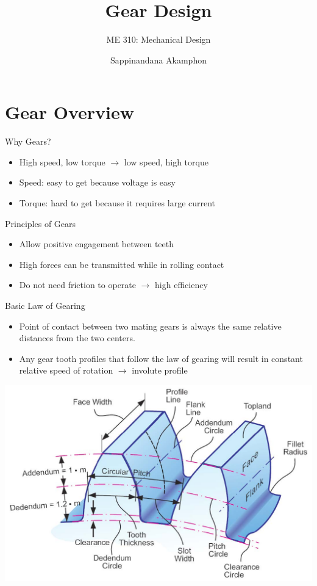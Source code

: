 \documentclass[10pt, svgnames]{beamer}
\author{Sappinandana Akamphon}
\date{}
\title{Gear Design}
\subtitle{ME 310: Mechanical Design}
\institute{Department of Mechanical Engineering, TSE}
\begin{document}
\maketitle

\section{Gear Overview}
\label{gear-overview}
\begin{frame}[label={sec:orgb5e6910}]{Why Gears?}
\begin{itemize}
\item High speed, low torque \(\rightarrow\) low speed, high torque

\item Speed: easy to get because voltage is easy

\item Torque: hard to get because it requires large current
\end{itemize}
\end{frame}

\begin{frame}[label={sec:org250578e}]{Principles of Gears}
\begin{itemize}
\item Allow positive engagement between teeth

\item High forces can be transmitted while in rolling contact

\item Do not need friction to operate \(\rightarrow\) high efficiency
\end{itemize}
\end{frame}

\begin{frame}[label={sec:org67ba456}]{Basic Law of Gearing}
\begin{itemize}
\item Point of contact between two mating gears is always the same relative
distances from the two centers.

\item Any gear tooth profiles that follow the law of gearing will result in
constant relative speed of rotation \(\rightarrow\) involute profile
\end{itemize}

\begin{center}
\includegraphics[width=.9\linewidth]{pictures/gear-profile.jpg}
\end{center}
\end{frame}
\end{document}

